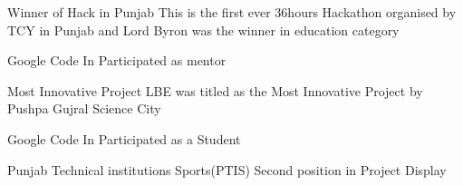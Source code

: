 {Winner of Hack in Punjab}
{}
{}
{}
{This is the first ever 36hours Hackathon organised by TCY in Punjab and Lord Byron was the winner in education category }

{Google Code In}
{}
{}
{}
{Participated as mentor}

{Most Innovative Project}
{}
{}
{}
{LBE was titled as the Most Innovative Project by Pushpa Gujral Science City}

{Google Code In}
{}
{}
{}
{Participated as a Student}

{Punjab Technical institutions Sports(PTIS)}
{}
{}
{}
{Second position in Project Display}